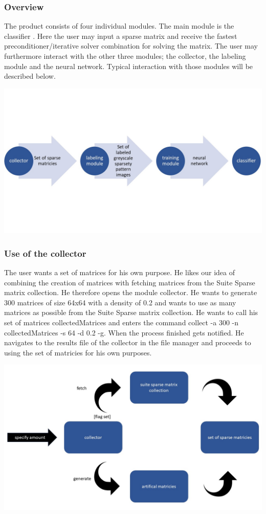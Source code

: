 \documentclass[parskip=full]{scrartcl}
\begin{document}
\subsubsection{Overview}
The product consists of four individual modules. The main module is the \gls{classifier} . Here the user may input a sparse matrix and receive the fastest \gls{preconditioner}/\gls{iterative solver} combination for solving the matrix. The user may furthermore interact with the other three modules; the \gls{collector}, the \gls{labeling module} and the \gls{neural network}.  Typical interaction with those modules will be described below.
\begin{center}
\includegraphics[width=\textwidth]{workflow}
\end{center}


\subsubsection{Use of the \gls{collector}}
The user wants a set of matrices for his own purpose. He likes our idea of combining the creation of matrices with fetching matrices from the \gls{Suite Sparse} matrix collection. He therefore opens the module \gls{collector}. He wants to generate 300 matrices of size 64x64 with a density of 0.2 and wants to use as many matrices as possible from the \gls{Suite Sparse} matrix collection. He wants to call his set of matrices collectedMatrices and enters the command collect -a 300 -n collectedMatrices -s 64 -d 0.2 -g. When the process finished gets notified. He navigates to the results file of the \gls{collector} in the file manager and proceeds to using the set of matricies for his own purposes.
\begin{center}
\includegraphics[width=\textwidth]{collector}
\end{center}
\end{document}
